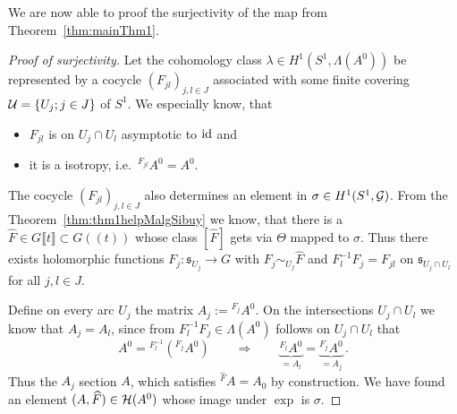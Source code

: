 We are now able to proof the surjectivity of the map from
Theorem~\ref{thm:mainThm1}.
\begin{proof}[Proof of surjectivity]
  Let the cohomology class $\lambda\in H^1(S^1,\Lambda(A^0))$ be represented by
  a cocycle $(F_{jl})_{j,l\in J}$ associated with some finite covering
  $\mathcal{U}=\{U_j;j\in J\}$ of $S^1$. We especially know, that
  \begin{itemize}
    \item $F_{jl}$ is on $U_j\cap U_l$ asymptotic to $\operatorname{id}$ and
    \item it is a isotropy, i.e.\  ${}^{F_{jl}}A^0=A^0$.
  \end{itemize}
  The cocycle $(F_{jl})_{j,l\in J}$ also determines an element in
  $\sigma\in H^1(S^1,\mathcal{G})$.
  From the Theorem~\ref{thm:thm1helpMalgSibuy} we know, that there is a $\hat
  F\in G\llbracket t\rrbracket\subset G(\!(t)\!)$ whose class $[\hat F]$ gets
  via $\Theta$ mapped to $\sigma$.
  Thus there exists holomorphic functions $F_j:\mathfrak{s}_{U_j}\to G$ with
  $F_j\sim_{U_j}\hat F$ and $F_l^{-1}F_j=F_{jl}$ on
  $\mathfrak{s}_{U_j\cap U_l}$ for all $j,l\in J$.

  Define on every arc $U_j$ the matrix $A_j:={}^{F_j}A^0$.
  On the intersections $U_j\cap U_l$ we know that $A_j=A_l$, since
  from $F_l^{-1}F_j\in\Lambda(A^0)$ follows on $U_j\cap U_l$ that
  \[
    A^0={}^{F_l^{-1}}({}^{F_j}A^0)
    \qquad\Rightarrow{}\qquad
    \underset{=A_l}{\underbrace{{}^{F_l}A^0}}
    =\underset{=A_j}{\underbrace{{}^{F_j}A^0}}
    \,.
  \]
  Thus the $A_j$  section $A$, which satisfies
  ${}^{\hat F}A=A_0$ by construction.
  We have found an element $(A,\widehat F)\in\mathcal{H}(A^0)$ whose image under $\exp$ is
  $\sigma$.
\end{proof}

